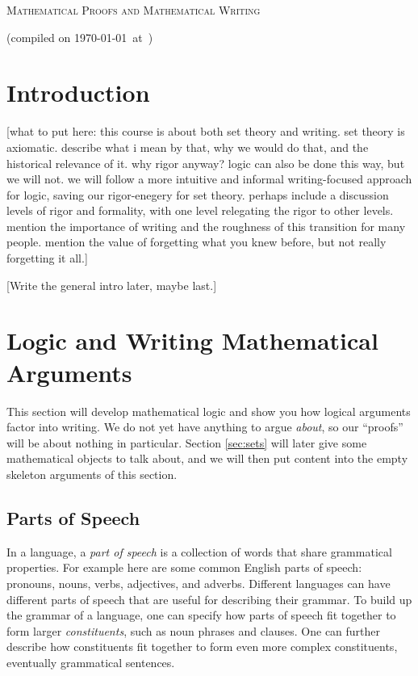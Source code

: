 \documentclass[12pt]{article}
\newcommand{\note}[1]{[#1]}
\begin{document}
\begin{center} {\Large \scshape Mathematical Proofs and Mathematical Writing}
\end{center}
(compiled on \today\ at\ \currenttime)
\hfill

\tableofcontents

\section{Introduction}

\note{what to put here:
this course is about both set theory and writing.
set theory is axiomatic. describe what i mean by that, why we would do that, and the historical relevance of it.
why rigor anyway?
logic can also be done this way, but we will not.
we will follow a more intuitive and informal writing-focused approach for logic,
saving our rigor-enegery for set theory.
perhaps include a discussion levels of rigor and formality, with one level relegating the rigor to other levels.
mention the importance of writing and the roughness of this transition for many people.
mention the value of forgetting what you knew before, but not really forgetting it all.}

\note{Write the general intro later, maybe last.}



\section{Logic and Writing Mathematical Arguments}
\label{sec:logic}

This section will develop mathematical logic and show you how logical arguments factor into writing.
We do not yet have anything to argue \emph{about}, so our ``proofs'' will be about nothing in particular.
Section \ref{sec:sets} will later give some mathematical objects to talk about, and we will then put
content into the empty skeleton arguments of this section.

\subsection{Parts of Speech}

In a language, a \emph{part of speech} is a collection of words that share grammatical properties.
For example here are some common English parts of speech: pronouns, nouns, verbs, adjectives, and adverbs.
Different languages can have different parts of speech that are useful for describing their grammar.
To build up the grammar of a language, one can specify how parts of speech fit together to form larger
\emph{constituents}, such as noun phrases and clauses. One can further describe how
constituents fit together to form even more complex constituents, eventually grammatical sentences.
\end{document}
